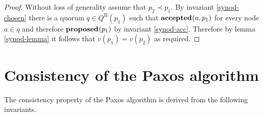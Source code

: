\documentclass[journal]{IEEEtran}
\begin{document}
\begin{proof} Without loss of generality assume that ${p_2 \prec p_1}$. By
invariant \ref{synod-chosen} there is a quorum $q \in Q^\textrm{II}(p_1)$ such
that $\mathbf{accepted}_{}(a,p_1)$ for every node $a \in q$ and therefore $\mathbf{proposed}_{}(p_1)$ by
invariant \ref{synod-acc}.  Therefore by lemma \ref{synod-lemma} it follows
that $v(p_1) = v(p_2)$ as required.  \end{proof}

\section{Consistency of the Paxos algorithm}\label{paxos-invariants}

The consistency property of the Paxos algorithm is derived from the following
invariants.
\end{document}
